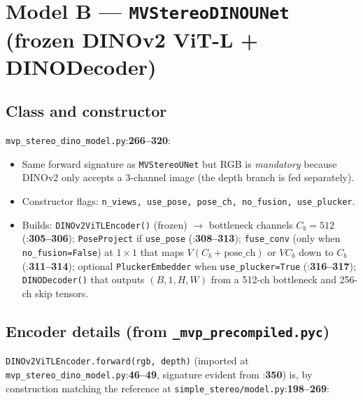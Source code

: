 \documentclass[11pt]{article}
\newcommand{\fref}[2]{\texttt{\textcolor{filegray}{#1}}:\textbf{#2}}
\begin{document}
\section{Model B --- \texttt{MVStereoDINOUNet}
(frozen DINOv2 ViT-L + DINODecoder)}

\subsection{Class and constructor}
\fref{mvp\_stereo\_dino\_model.py}{266--320}:

\begin{itemize}[leftmargin=2em]
  \item Same forward signature as \texttt{MVStereoUNet} but RGB is
        \emph{mandatory} because DINOv2 only accepts a 3-channel image
        (the depth branch is fed separately).
  \item Constructor flags: \texttt{n\_views, use\_pose, pose\_ch,
        no\_fusion, use\_plucker}.
  \item Builds:
    \texttt{DINOv2ViTLEncoder()} (frozen) $\to$ bottleneck channels
    $C_b = 512$
    (\fref{}{305--306});
    \texttt{PoseProject} if \texttt{use\_pose}
    (\fref{}{308--313});
    \texttt{fuse\_conv} (only when \texttt{no\_fusion=False}) at
    $1{\times}1$ that maps $V(C_b{+}\text{pose\_ch})$ or $V C_b$ down
    to $C_b$
    (\fref{}{311--314});
    optional \texttt{PluckerEmbedder} when \texttt{use\_plucker=True}
    (\fref{}{316--317});
    \texttt{DINODecoder()} that outputs $(B,1,H,W)$ from a 512-ch
    bottleneck and 256-ch skip tensors.
\end{itemize}

\subsection{Encoder details (from \texttt{\_mvp\_precompiled.pyc})}
\texttt{DINOv2ViTLEncoder.forward(rgb, depth)} (imported at
\fref{mvp\_stereo\_dino\_model.py}{46--49}, signature evident from
\fref{}{350}) is, by construction matching the reference at
\fref{simple\_stereo/model.py}{198--269}:
\end{document}
